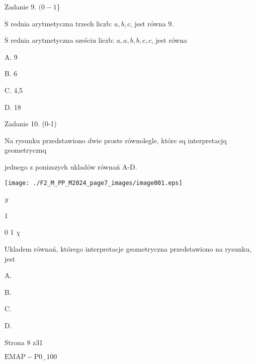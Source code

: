 \documentclass[a4paper,12pt]{article}
\begin{document}
Zadanie 9. $(0-1$\}

$\acute{\mathrm{S}}$ rednia arytmetyczna trzech liczb: $a, b, c$, jest równa 9.

$\acute{\mathrm{S}}$ rednia arytmetyczna sześciu liczb: $a, a, b, b, c, c$, jest równa

A. 9

B. 6

C. 4,5

D. 18

Zadanie 10. (0-1)

Na rysunku przedstawiono dwie proste równolegle, które sq interpretacjq geometrycznq

jednego z ponizszych ukladów równań A-D.
\begin{center}
\texttt{[image: ./F2\_M\_PP\_M2024\_page7\_images/image001.eps]}
\end{center}
{\it y}

1

0  1  $\chi$

Ukladem równań, którego interpretacje geometryczna przedstawiono na rysunku, jest

A. 

B. 

C. 

D. 

Strona 8 z31

$\mathrm{E}\mathrm{M}\mathrm{A}\mathrm{P}-\mathrm{P}0_{-}100$
\end{document}
